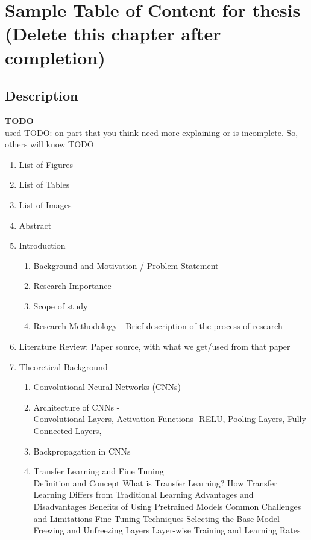 
\chapter{Sample Table of Content for thesis (Delete this chapter after completion)}
\section{Description}

\textbf{TODO}\\
used TODO: on part that you think need more explaining or is incomplete. So, others will know
TODO

\begin{enumerate}
    \item List of Figures
    \item List of Tables
    \item List of Images
    \item Abstract
    \item Introduction
        \begin{enumerate}
            \item Background and Motivation / Problem Statement
            \item Research Importance
            \item Scope of study
            \item Research Methodology - Brief description of the process of research
        \end{enumerate}
    \item Literature Review: Paper source, with what we get/used from that paper
    \item Theoretical Background
        \begin{enumerate}
            \item Convolutional Neural Networks (CNNs)
            \item Architecture of CNNs - \\
                    Convolutional Layers,
                    Activation Functions -RELU,
                    Pooling Layers,
                    Fully Connected Layers,
            \item Backpropagation in CNNs
            
            \item Transfer Learning and Fine Tuning \\
                Definition and Concept
                What is Transfer Learning?
                How Transfer Learning Differs from Traditional Learning
                Advantages and Disadvantages
                Benefits of Using Pretrained Models
                Common Challenges and Limitations
                Fine Tuning Techniques
                Selecting the Base Model
                Freezing and Unfreezing Layers
                Layer-wise Training and Learning Rates
                

\end{enumerate}
\end{enumerate}
